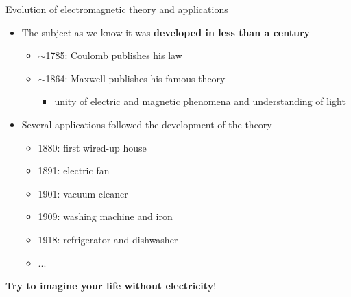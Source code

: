 \begin{frame}{Evolution of electromagnetic theory and applications}

\begin{itemize}

   \item The subject as we know it was {\bf developed in less than a century}
   \begin{itemize}
      \item $\sim$1785: Coulomb publishes his law
      \item $\sim$1864: Maxwell publishes his famous theory
        \begin{itemize}
            \item unity of electric and magnetic phenomena and understanding of light
        \end{itemize}
   \end{itemize}

   \item Several applications followed the development of the theory
   \begin{itemize}
     \item 1880: first wired-up house
     \item 1891: electric fan
     \item 1901: vacuum cleaner
     \item 1909: washing machine and iron
     \item 1918: refrigerator and dishwasher
     \item ...
   \end{itemize}
\end{itemize}

\begin{center}
  {\bf Try to imagine your life without electricity}!
\end{center}

\end{frame}

%
%
%

